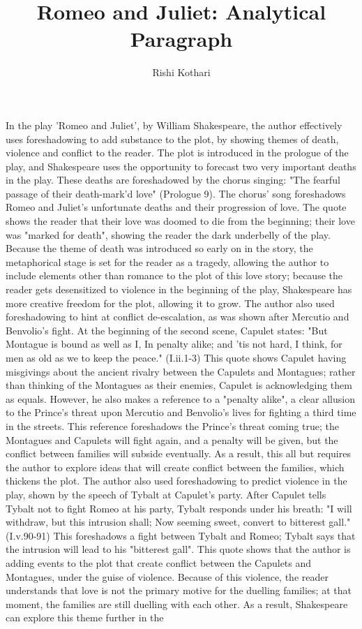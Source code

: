 \documentclass[12pt]{report}
\title{\Huge Romeo and Juliet: Analytical Paragraph}
\author{\LARGE Rishi Kothari}
\date{}
\begin{document}
\maketitle

\newpage


In the play 'Romeo and Juliet', by William Shakespeare, the author effectively uses foreshadowing to add substance to the plot, by showing themes of death, violence and conflict to the reader. The plot is introduced in the prologue of the play, and Shakespeare uses the opportunity to forecast two very important deaths in the play. These deaths are foreshadowed by the chorus singing: "The fearful passage of their death-mark'd love" (Prologue 9). The chorus' song foreshadows Romeo and Juliet's unfortunate deaths and their progression of love. The quote shows the reader that their love was doomed to die from the beginning; their love was "marked for death", showing the reader the dark underbelly of the play. Because the theme of death was introduced so early on in the story, the metaphorical stage is set for the reader as a tragedy, allowing the author to include elements other than romance to the plot of this love story; because the reader gets desensitized to violence in the beginning of the play, Shakespeare has more creative freedom for the plot, allowing it to grow. The author also used foreshadowing to hint at conflict de-escalation, as was shown after Mercutio and Benvolio's fight. At the beginning of the second scene, Capulet states: "But Montague is bound as well as I, In penalty alike; and 'tis not hard, I think, for men as old as we to keep the peace." (I.ii.1-3) This quote shows Capulet having misgivings about the ancient rivalry between the Capulets and Montagues; rather than thinking of the Montagues as their enemies, Capulet is acknowledging them as equals. However, he also makes a reference to a "penalty alike", a clear allusion to the Prince's threat upon Mercutio and Benvolio's lives for fighting a third time in the streets. This reference foreshadows the Prince's threat coming true; the Montagues and Capulets will fight again, and a penalty will be given, but the conflict between families will subside eventually. As a result, this all but requires the author to explore ideas that will create conflict between the families, which thickens the plot. The author also used foreshadowing to predict violence in the play, shown by the speech of Tybalt at Capulet's party. After Capulet tells Tybalt not to fight Romeo at his party, Tybalt responds under his breath: "I will withdraw, but this intrusion shall; Now seeming sweet, convert to bitterest gall." (I.v.90-91) This foreshadows a fight between Tybalt and Romeo; Tybalt says that the intrusion will lead to his "bitterest gall". This quote shows that the author is adding events to the plot that create conflict between the Capulets and Montagues, under the guise of violence. Because of this violence, the reader understands that love is not the primary motive for the duelling families; at that moment, the families are still duelling with each other. As a result, Shakespeare can explore this theme further in the 
\end{document}
